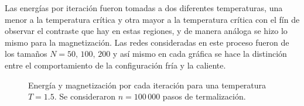 \documentclass[11pt,a4paper]{article}
\begin{document}
Las energías por iteración fueron tomadas a dos diferentes temperaturas, una menor a la temperatura crítica y otra mayor a la temperatura crítica con el fín de observar el contraste que hay en estas regiones, y de manera análoga se hizo lo mismo para la magnetización. Las redes consideradas en este proceso fueron de los tamaños $N=50,\, 100,\, 200$ y así mismo en cada gráfica se hace la distinción entre el comportamiento de la configuración fría y la caliente.

\begin{figure}[h!]
\centering
\caption{Energía y magnetización por cada iteración para una temperatura $T=1.5$. Se consideraron $n=100\, 000$ pasos de termalización.}	
\label{fig:EM15}
\end{figure}
\end{document}
